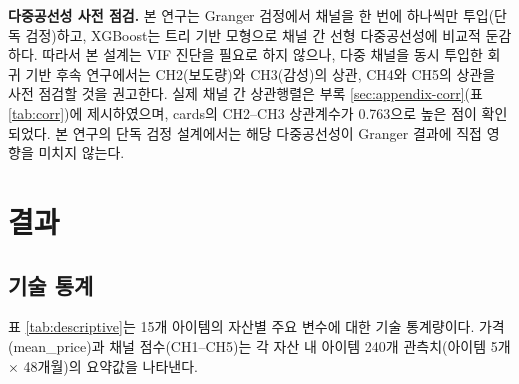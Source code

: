 \documentclass[11pt, a4paper, twocolumn]{article}
\begin{document}
\textbf{다중공선성 사전 점검.} 본 연구는 Granger 검정에서 채널을 한
번에 하나씩만 투입(단독 검정)하고, XGBoost는 트리 기반 모형으로 채널
간 선형 다중공선성에 비교적 둔감하다. 따라서 본 설계는 VIF 진단을
필요로 하지 않으나, 다중 채널을 동시 투입한 회귀 기반 후속 연구에서는
CH2(보도량)와 CH3(감성)의 상관, CH4와 CH5의 상관을 사전 점검할 것을
권고한다. 실제 채널 간 상관행렬은 부록 \ref{sec:appendix-corr}(표
\ref{tab:corr})에 제시하였으며, cards의 CH2--CH3 상관계수가 0.763으로
높은 점이 확인되었다. 본 연구의 단독 검정 설계에서는 해당 다중공선성이
Granger 결과에 직접 영향을 미치지 않는다.

\section{결과}\label{sec:results}

\subsection{기술 통계}\label{sec:results-descriptive}

표 \ref{tab:descriptive}는 15개 아이템의 자산별 주요 변수에 대한 기술
통계량이다. 가격(\textsf{mean\_price})과 채널 점수(CH1--CH5)는 각 자산
내 아이템 240개 관측치(아이템 5개 $\times$ 48개월)의 요약값을 나타낸다.
\end{document}
